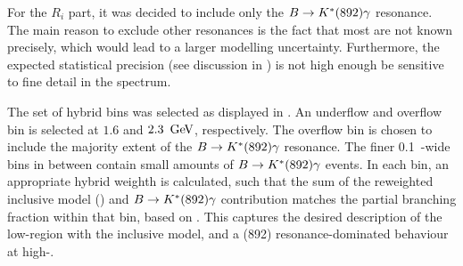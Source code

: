 For the $R_i$ part, it was decided to include only the $B\rightarrow K^*(892)\gamma$ resonance.
The main reason to exclude other resonances is the fact that most are not known precisely, which would lead to a larger modelling uncertainty.
Furthermore, the expected statistical precision (see discussion in ) is not high enough be sensitive to fine detail in the spectrum.

The set of hybrid bins was selected as displayed in .
An underflow and overflow bin is selected at $1.6$ and $2.3~\mathrm{\,Ge\kern -0.1em V}$, respectively.
The overflow bin is chosen to include the majority extent of the $B\rightarrow K^*(892)\gamma$ resonance.
The finer 0.1~\gev-wide bins in between contain small amounts of $B\rightarrow K^*(892)\gamma$ events.
In each \EB bin, an appropriate hybrid weighth is calculated, such that the sum of the reweighted inclusive model () and $B\rightarrow K^*(892)\gamma$ contribution matches the partial branching fraction within that \EB bin, based on .
This captures the desired description of the low-\EB region with the inclusive model, and a \Kstar(892) resonance-dominated behaviour at high-\EB.

